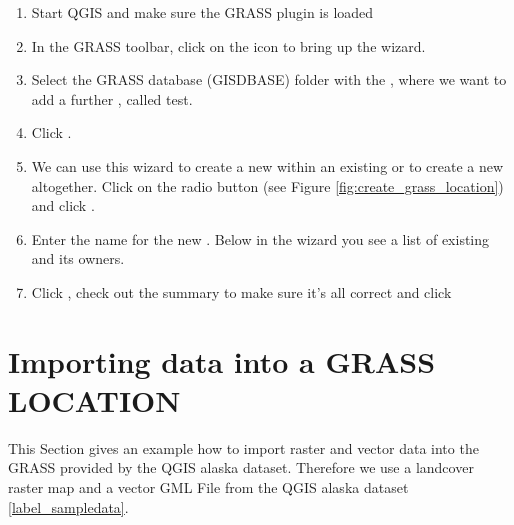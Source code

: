\begin{enumerate}
  \item Start QGIS and make sure the GRASS plugin is loaded
  \item In the GRASS toolbar, click on the
   icon to bring up the
   wizard.
  \item Select the GRASS database (GISDBASE) folder 
  with the , where we want to add a further
  , called test.
  \item Click .
  \item We can use this wizard to create a new  within an
  existing  or to create a new 
  altogether. Click on the radio button 
  (see Figure \ref{fig:create_grass_location}) and click .
  \item Enter the name  for the new . Below
  in the wizard you see a list of existing  and its owners.
  \item Click , check out the summary to make sure it's all
  correct and click 
\end{enumerate}

\section{Importing data into a GRASS LOCATION}\label{sec:import_loc_data}

This Section gives an example how to import raster and vector data into the
 GRASS  provided by the QGIS alaska
dataset. Therefore we use a landcover raster map 
and a vector GML File  from the QGIS alaska
dataset \ref{label_sampledata}.

